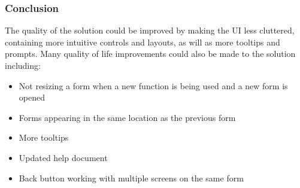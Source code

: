 \documentclass[oneside,openany,11pt,a4paper]{report}
\begin{document}
\subsubsection{Conclusion}
The quality of the solution could be improved by making the UI less cluttered, containing more intuitive controls and layouts, as will as more tooltips and prompts. Many quality of life improvements could also be made to the solution including:
	
	\begin{itemize}
	\itemsep0em
	\item Not resizing a form when a new function is being used and a new form is opened
	\item Forms appearing in the same location as the previous form
	\item More tooltips
	\item Updated help document
	\item Back button working with multiple screens on the same form
\end{itemize} 
	
	
	
	
	
	
	
\end{document}
